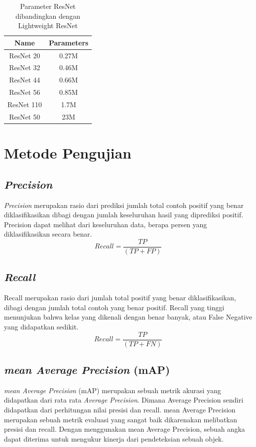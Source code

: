 \begin{table}[h!]
	\begin{center}
		\begin{tabular}{|c|c|}
			\hline
			\textbf{Name} & \textbf{Parameters} \\ \hline
			ResNet 20 & 0.27M \\ \hline
			ResNet 32 & 0.46M \\ \hline
			ResNet 44 & 0.66M \\ \hline
			ResNet 56 & 0.85M \\ \hline
			ResNet 110 & 1.7M \\ \hline
			ResNet 50 & 23M \\ \hline
		\end{tabular}
	\end{center}
	\vspace{1ex}
	\caption{Parameter ResNet dibandingkan dengan Lightweight ResNet}
	\label{tabel:1}
\end{table}

\pagebreak

\section{Metode Pengujian}
\vspace{1ex}

\subsection{\textit{Precision}}
\vspace{1ex}
\textit{Precision} merupakan rasio dari prediksi jumlah total contoh positif yang benar diklasifikasikan dibagi dengan jumlah keseluruhan hasil yang diprediksi positif. Precision dapat melihat dari keseluruhan data, berapa persen yang diklasifikasikan secara benar.
\[Recall = \frac{TP}{(TP+FP)}\]

\subsection{\textit{Recall}}
\vspace{1ex}
Recall merupakan rasio dari jumlah total positif yang benar diklasifikasikan, dibagi dengan jumlah total contoh yang benar positif. Recall yang tinggi menunjukan bahwa kelas yang dikenali dengan benar banyak, atau False Negative yang didapatkan sedikit.
\[Recall = \frac{TP}{(TP+FN)}\]

\subsection{\textit{mean Average Precision} (mAP)}
\vspace{1ex}
\textit{mean Average Precision} (mAP) merupakan sebuah metrik akurasi yang didapatkan dari rata rata \textit{Average Precision}. Dimana Average Precision sendiri didapatkan dari perhitungan nilai presisi dan recall. mean Average Precision merupakan sebuah metrik evaluasi yang sangat baik dikarenakan melibatkan presisi dan recall. Dengan menggunakan mean Average Precision, sebuah angka dapat diterima untuk mengukur kinerja dari pendeteksian sebuah objek.

